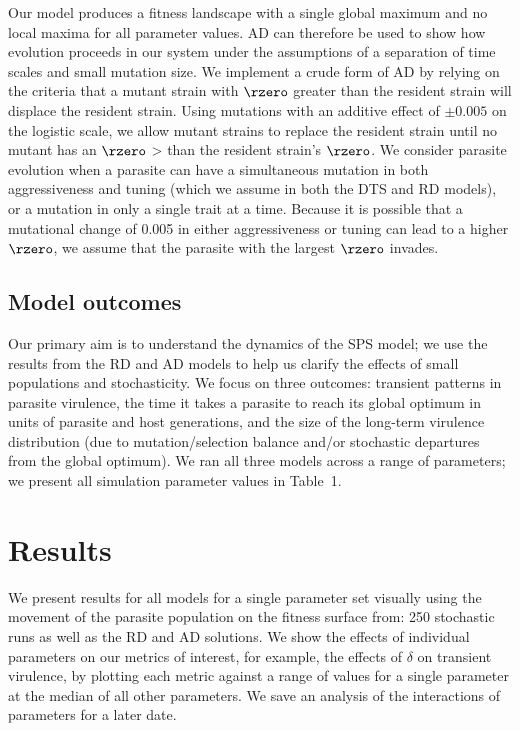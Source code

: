 Our model produces a fitness landscape with a single global maximum and no local maxima for all parameter values. AD can therefore be used to show how evolution proceeds in our system under the assumptions of a separation of time scales and small mutation size. We implement a crude form of AD by relying on the criteria that a mutant strain with $\rzero$ greater than the resident strain will displace the resident strain. Using mutations with an additive effect of $\pm 0.005$ on the logistic scale, we allow mutant strains to replace the resident strain until no mutant has an $\rzero$ > than the resident strain's $\rzero$. We consider parasite evolution when a parasite can have a simultaneous mutation in both aggressiveness and tuning (which we assume in both the DTS and RD models), or a mutation in only a single trait at a time. Because it is possible that a mutational change of 0.005 in either aggressiveness or tuning can lead to a higher $\rzero$, we assume that the parasite with the largest $\rzero$ invades.

\subsection*{Model outcomes}

Our primary aim is to understand the dynamics of the SPS model; we use the results from the RD and AD models to help us clarify the effects of small populations and stochasticity. We focus on three outcomes: transient patterns in parasite virulence, the time it takes a parasite to reach its global optimum in units of parasite and host generations, and the size of the long-term virulence distribution (due to mutation/selection balance and/or stochastic departures from the global optimum). We ran all three models across a range of parameters; we present all simulation parameter values in Table~1. 



\section*{Results}

We present results for all models for a single parameter set visually using the movement of the parasite population on the fitness surface from: 250 stochastic runs as well as the RD and AD solutions. We show the effects of individual parameters on our metrics of interest, for example, the effects of $\delta$ on transient virulence, by plotting each metric against a range of values for a single parameter at the median of all other parameters. We save an analysis of the interactions of parameters for a later date.

